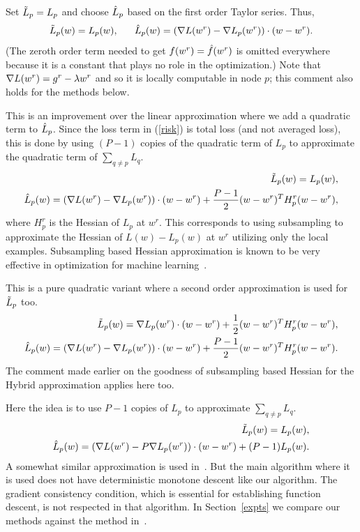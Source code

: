 \documentclass[twoside, 11pt]{article}
\begin{document}
 Set $\tilde{L}_p=L_p$ and choose $\hat{L}_p$ based on the first order Taylor series. Thus,
\begin{equation}
\tilde{L}_p(w) = L_p(w), \;\;\;\;\;\; \hat{L}_p(w) = (\nabla L(w^r) - \nabla L_p(w^r))\cdot(w-w^r).
\label{linapp}
\end{equation}
(The zeroth order term needed to get $f(w^r)=\hat{f}(w^r)$ is omitted everywhere because it is a constant that plays no role in the optimization.) Note that $\nabla L(w^r) = g^r - \lambda w^r$ and so it is locally computable in node $p$; this comment also holds for the methods below.


This is an improvement over the linear approximation where we add a quadratic term to $\hat{L}_p$. Since the loss term in (\ref{risk}) is total loss (and not averaged loss), this is done by using $(P-1)$ copies of the quadratic term of $L_p$ to approximate the quadratic term of $\sum_{q\not=p} L_q$.
\begin{eqnarray}
\tilde{L}_p(w) = L_p(w), \\
\hat{L}_p(w) = (\nabla L(w^r) - \nabla L_p(w^r))\cdot(w-w^r) + \frac{P-1}{2} (w-w^r)^T H_p^r (w-w^r),
\label{hybapp}
\end{eqnarray}
where $H_p^r$ is the Hessian of $L_p$ at $w^r$.
This corresponds to using subsampling to approximate the Hessian of $L(w)-L_p(w)$ at $w^r$ utilizing only the local examples. Subsampling based Hessian approximation is known to be very effective in optimization for machine learning~\citep{byrd2012}.

This is a pure quadratic variant where a second order approximation is used for $\tilde{L}_p$ too.
\begin{eqnarray}
\tilde{L}_p(w) = \nabla L_p(w^r) \cdot (w-w^r) + \frac{1}{2} (w-w^r)^T H_p^r (w-w^r), \label{quadapp1} \\
\hat{L}_p(w) = (\nabla L(w^r) - \nabla L_p(w^r))\cdot(w-w^r) + \frac{P-1}{2} (w-w^r)^T H_p^r (w-w^r).
\label{quadapp}
\end{eqnarray}
The comment made earlier on the goodness of subsampling based Hessian for the Hybrid approximation applies here too.


Here the idea is to use $P-1$ copies of $L_p$ to approximate $\sum_{q\not=p} L_q$.
\begin{eqnarray}
\label{sszapp1}
\tilde{L}_p(w) = L_p(w), \\
\hat{L}_p(w) = (\nabla L(w^r) - P\nabla L_p(w^r))\cdot(w-w^r) + (P-1)L_p(w).
\label{sszapp2}
\end{eqnarray}
A somewhat similar approximation is used in~\citet{sharir2014}. But the main algorithm where it is used does not have deterministic monotone descent like our algorithm. The gradient consistency condition, which is essential for establishing function descent, is not respected in that algorithm. In Section~\ref{expts} we compare our methods against the method in~\citet{sharir2014}.
\end{document}
